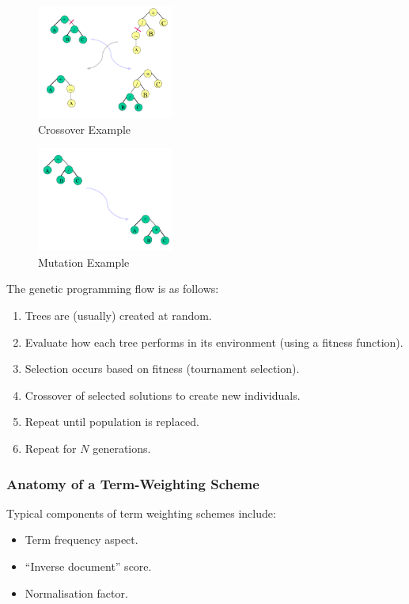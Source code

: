 \documentclass[a4paper,11pt]{article}
\begin{document}
\begin{figure}[H]
    \centering
    \includegraphics[width=0.4\textwidth]{./images/crossover.png}
    \caption{Crossover Example}
\end{figure}

\begin{figure}[H]
    \centering
    \includegraphics[width=0.4\textwidth]{./images/mutation.png}
    \caption{Mutation Example}
\end{figure}

The genetic programming flow is as follows:
\begin{enumerate}
    \item   Trees are (usually) created at random.
    \item   Evaluate how each tree performs in its environment (using a fitness function).
    \item   Selection occurs based on fitness (tournament selection).
    \item   Crossover of selected solutions to create new individuals.
    \item   Repeat until population is replaced.
    \item   Repeat for $N$ generations.
\end{enumerate}

\subsubsection{Anatomy of a Term-Weighting Scheme}
Typical components of term weighting schemes include:
\begin{itemize}
    \item   Term frequency aspect.
    \item   ``Inverse document'' score.
    \item   Normalisation factor.
\end{itemize}
\end{document}
